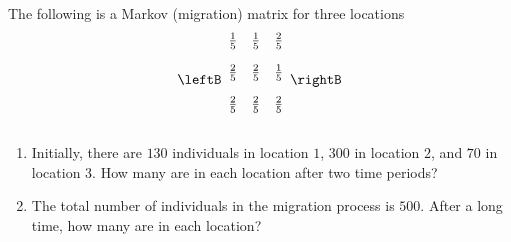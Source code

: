 \begin{enumialphparenastyle}
\begin{ex} The following is a Markov (migration) matrix for three locations
\begin{equation*}
\leftB
\begin{array}{rrr}
\vspace{0.05in}\frac{1}{5} & \vspace{0.05in}\frac{1}{5} & \vspace{0.05in}\frac{2}{5} \\
\vspace{0.05in}\frac{2}{5} & \vspace{0.05in}\frac{2}{5} & \vspace{0.05in}\frac{1}{5} \\
\vspace{0.05in}\frac{2}{5} & \vspace{0.05in}\frac{2}{5} & \vspace{0.05in}\frac{2}{5}
\end{array}
\rightB 
\end{equation*}
\begin{enumerate}
\item Initially, there are $130$ individuals in location $1$, $300$ in location $2$, and $70$ in location $3$. How many are in each location after two time periods?

\item
The total number of individuals in the migration process is $500.$ After a
long time, how many are in each location?
\end{enumerate}
\end{ex}



\end{enumialphparenastyle}
